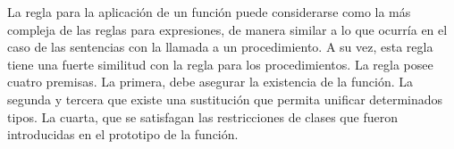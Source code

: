 


La regla para la aplicación de un función puede considerarse como la más compleja de las reglas para expresiones, de manera similar a lo que ocurría
en el caso de las sentencias con la llamada a un procedimiento. A su vez, esta regla tiene una fuerte similitud con la regla para los procedimientos.
La regla posee cuatro premisas. La primera, debe asegurar la existencia
de la función. La segunda y tercera que existe una sustitución que permita
unificar determinados tipos. La cuarta, que se satisfagan las restricciones de clases que fueron introducidas en el prototipo de la función.

